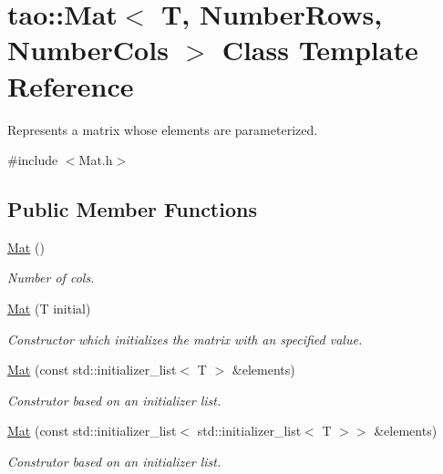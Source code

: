 \hypertarget{classtao_1_1_mat}{}\section{tao\+::Mat$<$ T, Number\+Rows, Number\+Cols $>$ Class Template Reference}
\label{classtao_1_1_mat}


Represents a matrix whose elements are parameterized.  




{\ttfamily \#include $<$Mat.\+h$>$}

\subsection*{Public Member Functions}
\begin{DoxyCompactItemize}
\item 
\mbox{\label{classtao_1_1_mat_a3422e33caa3cc8042afdbbdf05626d89}} 
\mbox{\hyperlink{classtao_1_1_mat_a3422e33caa3cc8042afdbbdf05626d89}{Mat}} ()
\begin{DoxyCompactList}\small\item\em Number of cols. \end{DoxyCompactList}\item 
\mbox{\hyperlink{classtao_1_1_mat_a6faedd42462e245d11493065dc538b31}{Mat}} (T initial)
\begin{DoxyCompactList}\small\item\em Constructor which initializes the matrix with an specified value. \end{DoxyCompactList}\item 
\mbox{\hyperlink{classtao_1_1_mat_a67875374bb4300b8b9a3b57eabb16450}{Mat}} (const std\+::initializer\+\_\+list$<$ T $>$ \&elements)
\begin{DoxyCompactList}\small\item\em Construtor based on an initializer list. \end{DoxyCompactList}\item 
\mbox{\hyperlink{classtao_1_1_mat_a4e3a587a2d6466f391c4163dac1ddf24}{Mat}} (const std\+::initializer\+\_\+list$<$ std\+::initializer\+\_\+list$<$ T $>$$>$ \&elements)
\begin{DoxyCompactList}\small\item\em Construtor based on an initializer list. \end{DoxyCompactList}\item 
$$
\end{DoxyCompactItemize}
